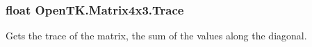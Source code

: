 \hypertarget{struct_open_t_k_1_1_matrix4x3_ac1d64cb2529de61783a6b93e0e7c425d}{
\subsubsection[{Trace}]{\setlength{\rightskip}{0pt plus 5cm}float Open\-T\-K.\-Matrix4x3.\-Trace\hspace{0.3cm}{\ttfamily [get]}}}\label{struct_open_t_k_1_1_matrix4x3_ac1d64cb2529de61783a6b93e0e7c425d}


Gets the trace of the matrix, the sum of the values along the diagonal. 

